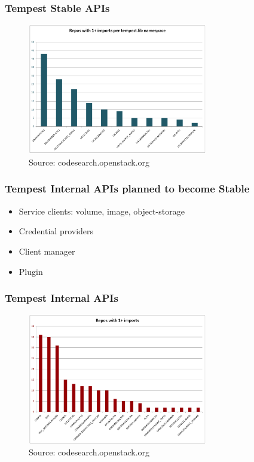 \documentclass[aspectratio=169,11pt,hyperref={colorlinks=true}]{beamer}
\begin{document}
\begin{frame}
    \frametitle{Tempest Stable APIs}
    \begin{figure}[p]
    	\centering
    	\includegraphics[width=0.7\textwidth]{lib-imports.png}
    	\caption{Source: codesearch.openstack.org}
    \end{figure}
\end{frame}

\begin{frame}
    \frametitle{Tempest Internal APIs planned to become Stable}
    \begin{itemize}
        \item{Service clients: volume, image, object-storage}
        \item{Credential providers}
        \item{Client manager}
        \item{Plugin}
    \end{itemize}
\end{frame}

\begin{frame}
    \frametitle{Tempest Internal APIs}
    \begin{figure}[p]
    	\centering
    	\includegraphics[width=0.7\textwidth]{tempest-imports.png}
    	\caption{Source: codesearch.openstack.org}
    \end{figure}
\end{frame}
\end{document}
